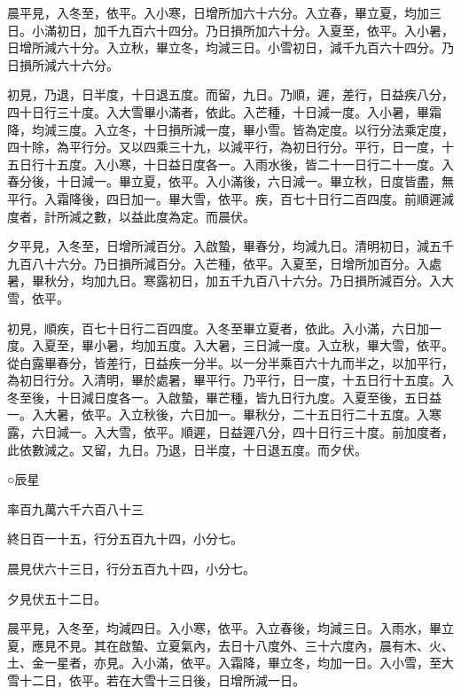 \begin{pinyinscope}
 晨平見，入冬至，依平。入小寒，日增所加六十六分。入立春，畢立夏，均加三日。小滿初日，加千九百六十四分。乃日損所加六十分。入夏至，依平。入小暑，日增所減六十分。入立秋，畢立冬，均減三日。小雪初日，減千九百六十四分。乃日損所減六十六分。



 初見，乃退，日半度，十日退五度。而留，九日。乃順，遲，差行，日益疾八分，四十日行三十度。入大雪畢小滿者，依此。入芒種，十日減一度。入小暑，畢霜降，均減三度。入立冬，十日損所減一度，畢小雪。皆為定度。以行分法乘定度，四十除，為平行分。又以四乘三十九，以減平行，為初日行分。平行，日一度，十五日行十五度。入小寒，十日益日度各一。入雨水後，皆二十一日行二十一度。入春分後，十日減一。畢立夏，依平。入小滿後，六日減一。畢立秋，日度皆盡，無平行。入霜降後，四日加一。畢大雪，依平。疾，百七十日行二百四度。前順遲減度者，計所減之數，以益此度為定。而晨伏。



 夕平見，入冬至，日增所減百分。入啟蟄，畢春分，均減九日。清明初日，減五千九百八十六分。乃日損所減百分。入芒種，依平。入夏至，日增所加百分。入處暑，畢秋分，均加九日。寒露初日，加五千九百八十六分。乃日損所減百分。入大雪，依平。



 初見，順疾，百七十日行二百四度。入冬至畢立夏者，依此。入小滿，六日加一度。入夏至，畢小暑，均加五度。入大暑，三日減一度。入立秋，畢大雪，依平。從白露畢春分，皆差行，日益疾一分半。以一分半乘百六十九而半之，以加平行，為初日行分。入清明，畢於處暑，畢平行。乃平行，日一度，十五日行十五度。入冬至後，十日減日度各一。入啟蟄，畢芒種，皆九日行九度。入夏至後，五日益一。入大暑，依平。入立秋後，六日加一。畢秋分，二十五日行二十五度。入寒露，六日減一。入大雪，依平。順遲，日益遲八分，四十日行三十度。前加度者，此依數減之。又留，九日。乃退，日半度，十日退五度。而夕伏。



 ○辰星



 率百九萬六千六百八十三



 終日百一十五，行分五百九十四，小分七。



 晨見伏六十三日，行分五百九十四，小分七。



 夕見伏五十二日。



 晨平見，入冬至，均減四日。入小寒，依平。入立春後，均減三日。入雨水，畢立夏，應見不見。其在啟蟄、立夏氣內，去日十八度外、三十六度內，晨有木、火、土、金一星者，亦見。入小滿，依平。入霜降，畢立冬，均加一日。入小雪，至大雪十二日，依平。若在大雪十三日後，日增所減一日。




\end{pinyinscope}
